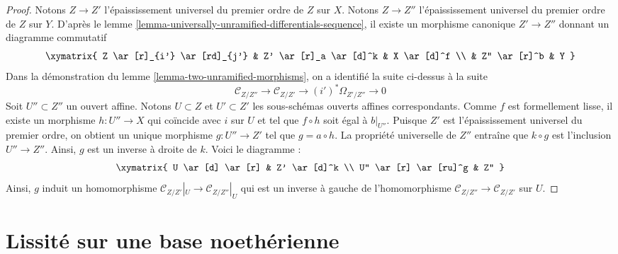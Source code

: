\begin{proof}
Notons $Z \to Z'$ l'épaississement universel du premier ordre de $Z$ sur $X$.
Notons $Z \to Z''$ l'épaississement universel du premier ordre de $Z$ sur $Y$.
D'après
le lemme \ref{lemma-universally-unramified-differentials-sequence},
il existe un morphisme canonique $Z' \to Z''$ donnant un diagramme
commutatif
$$
\xymatrix{
Z \ar[r]_{i'} \ar[rd]_{j'} & Z' \ar[r]_a \ar[d]^k & X \ar[d]^f \\
& Z'' \ar[r]^b & Y
}
$$
Dans la démonstration du
lemme \ref{lemma-two-unramified-morphisms},
on a identifié la suite ci-dessus à la suite
$$
\mathcal{C}_{Z/Z''} \to
\mathcal{C}_{Z/Z'} \to
(i')^*\Omega_{Z'/Z''} \to 0
$$
Soit $U'' \subset Z''$ un ouvert affine. Notons $U \subset Z$ et
$U' \subset Z'$ les sous-schémas ouverts affines correspondants.
Comme $f$ est formellement lisse, il existe un morphisme $h : U'' \to X$
qui coïncide avec $i$ sur $U$ et tel que $f \circ h$ soit égal à $b|_{U''}$.
Puisque $Z'$ est l'épaississement universel du premier ordre, on obtient un unique
morphisme $g : U'' \to Z'$ tel que $g = a \circ h$. La propriété
universelle de $Z''$ entraîne que $k \circ g$ est l'inclusion
$U'' \to Z''$. Ainsi, $g$ est un inverse à droite de $k$. Voici le diagramme :
$$
\xymatrix{
U \ar[d] \ar[r] & Z' \ar[d]^k \\
U'' \ar[r] \ar[ru]^g & Z''
}
$$
Ainsi, $g$ induit un homomorphisme $\mathcal{C}_{Z/Z'}|_U \to \mathcal{C}_{Z/Z''}|_U$
qui est un inverse à gauche de l'homomorphisme
$\mathcal{C}_{Z/Z''} \to \mathcal{C}_{Z/Z'}$ sur $U$.
\end{proof}




































\section{Lissité sur une base noethérienne}
\label{section-smooth-Noetherian}

